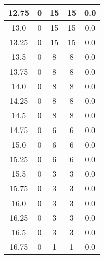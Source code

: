 \documentclass[letterpaper, 12pt]{article}
\begin{document}
\begin{longtable}{|c|c|c|c|c|}
\hline
12.75 & 0 & 15 & 15 & 0.0 \\
\hline
13.0 & 0 & 15 & 15 & 0.0 \\
\hline
13.25 & 0 & 15 & 15 & 0.0 \\
\hline
13.5 & 0 & 8 & 8 & 0.0 \\
\hline
13.75 & 0 & 8 & 8 & 0.0 \\
\hline
14.0 & 0 & 8 & 8 & 0.0 \\
\hline
14.25 & 0 & 8 & 8 & 0.0 \\
\hline
14.5 & 0 & 8 & 8 & 0.0 \\
\hline
14.75 & 0 & 6 & 6 & 0.0 \\
\hline
15.0 & 0 & 6 & 6 & 0.0 \\
\hline
15.25 & 0 & 6 & 6 & 0.0 \\
\hline
15.5 & 0 & 3 & 3 & 0.0 \\
\hline
15.75 & 0 & 3 & 3 & 0.0 \\
\hline
16.0 & 0 & 3 & 3 & 0.0 \\
\hline
16.25 & 0 & 3 & 3 & 0.0 \\
\hline
16.5 & 0 & 3 & 3 & 0.0 \\
\hline
16.75 & 0 & 1 & 1 & 0.0 \\
\hline
\end{longtable}
\end{document}
